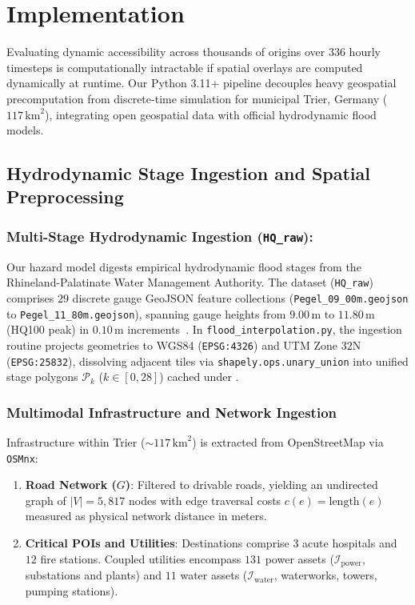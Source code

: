 
\section{Implementation}
\label{sec:implementation}

Evaluating dynamic accessibility across thousands of origins over 336 hourly timesteps is computationally intractable if spatial overlays are computed dynamically at runtime.
Our Python 3.11+ pipeline decouples heavy geospatial precomputation from discrete-time simulation for municipal Trier, Germany ($117\,\text{km}^2$), integrating open geospatial data with official hydrodynamic flood models.


\subsection{Hydrodynamic Stage Ingestion and Spatial Preprocessing}
\label{subsec:data-ingestion}

\subsubsection{Multi-Stage Hydrodynamic Ingestion (\texttt{HQ\_raw}):}
Our hazard model digests empirical hydrodynamic flood stages from the Rhineland-Palatinate Water Management Authority.
The dataset (\texttt{HQ\_raw}) comprises $29$ discrete gauge GeoJSON feature collections (\texttt{Pegel\_09\_00m.geojson} to \texttt{Pegel\_11\_80m.geojson}), spanning gauge heights from $9.00\,\text{m}$ to $11.80\,\text{m}$ (HQ100 peak) in $0.10\,\text{m}$ increments~\cite{trier_geodaten}.
In \texttt{flood\_interpolation.py}, the ingestion routine projects geometries to WGS84 (\texttt{EPSG:4326}) and UTM Zone 32N (\texttt{EPSG:25832}), dissolving adjacent tiles via \texttt{shapely.ops.unary\_union} into unified stage polygons $\mathcal{P}_k$ ($k \in [0, 28]$) cached under .

\subsubsection{Multimodal Infrastructure and Network Ingestion}
Infrastructure within Trier ($\sim 117\,\text{km}^2$) is extracted from OpenStreetMap via \texttt{OSMnx}:

\begin{enumerate}
  \item \textbf{Road Network ($G$)}: Filtered to drivable roads, yielding an undirected graph of $|V| = 5{,}817$ nodes with edge traversal costs $c(e) = \text{length}(e)$ measured as physical network distance in meters.
  \item \textbf{Critical POIs and Utilities}: Destinations comprise $3$ acute hospitals and $12$ fire stations.
  Coupled utilities encompass $131$ power assets ($\mathcal{I}_{\text{power}}$, substations and plants) and $11$ water assets ($\mathcal{I}_{\text{water}}$, waterworks, towers, pumping stations).
\end{enumerate}

